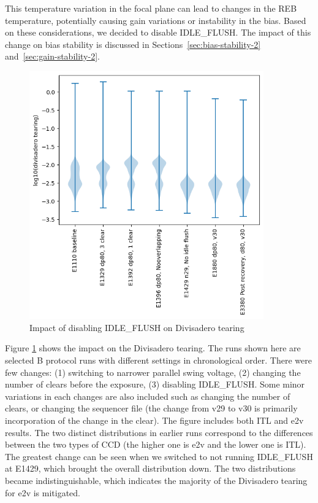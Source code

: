 This temperature variation in the focal plane can lead to changes in the REB temperature, potentially causing gain variations or instability in the bias. Based on these considerations, we decided to disable IDLE\_FLUSH. The impact of this change on bias stability is discussed in Sections~\ref{sec:bias-stability-2} and~\ref{sec:gain-stability-2}.

\begin{figure}
\begin{centering}
\includegraphics[width=0.9\textwidth]{figures/divisadero.png}
\end{centering}
\caption{Impact of disabling IDLE\_FLUSH on Divisadero tearing}\label{IdleFlushEffect:divisadero}
\end{figure}
Figure \ref{IdleFlushEffect:divisadero} shows the impact on the Divisadero tearing. The runs shown here are selected B protocol runs with different settings in chronological order. There were few changes: (1) switching to narrower parallel swing voltage, (2) changing the number of clears before the exposure, (3) disabling IDLE\_FLUSH.  Some minor variations in each changes are also included such as changing the number of clears, or changing the sequencer file (the change from v29 to v30  is primarily incorporation of the change in the clear). The figure includes both ITL and e2v results. The two distinct distributions in earlier runs correspond to the differences between the two types of CCD (the higher one is e2v and the lower one is ITL). The greatest change can be seen when we switched to not running IDLE\_FLUSH at E1429, which brought the overall distribution down. The two distributions became indistinguishable, which indicates the majority of the Divisadero tearing for e2v is mitigated.

